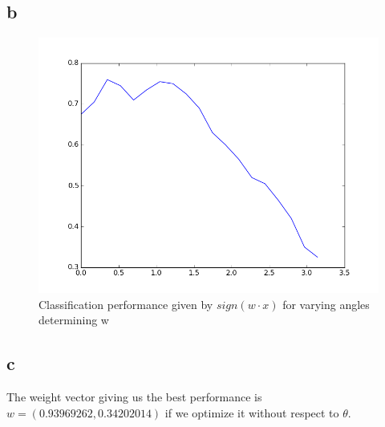 \documentclass[11pt,a4paper]{article}
\begin{document}
\subsection*{b}
\begin{figure}[h]
  \centering
  \includegraphics[width=\textwidth]{Classification_performance_for_alpha.png}
  \caption{Classification performance given by $sign(w \cdot x)$ for varying angles determining w}
\end{figure}
\subsection*{c}
The weight vector giving us the best performance is $w = (0.93969262,  0.34202014)$ if we optimize it without respect to $\theta$.
\newpage
\end{document}

